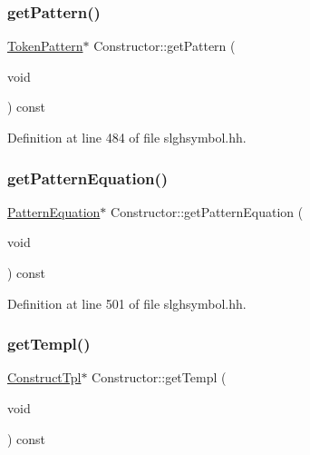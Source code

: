 \subsubsection{\texorpdfstring{getPattern()}{getPattern()}}
{\footnotesize\ttfamily \mbox{\hyperlink{class_token_pattern}{Token\+Pattern}}$\ast$ Constructor\+::get\+Pattern (\begin{DoxyParamCaption}\item[{void}]{ }\end{DoxyParamCaption}) const\hspace{0.3cm}{\ttfamily [inline]}}



Definition at line 484 of file slghsymbol.\+hh.

\mbox{\label{class_constructor_aec435892cdb0a58e40c30f301dc73ced}} 
\subsubsection{\texorpdfstring{getPatternEquation()}{getPatternEquation()}}
{\footnotesize\ttfamily \mbox{\hyperlink{class_pattern_equation}{Pattern\+Equation}}$\ast$ Constructor\+::get\+Pattern\+Equation (\begin{DoxyParamCaption}\item[{void}]{ }\end{DoxyParamCaption}) const\hspace{0.3cm}{\ttfamily [inline]}}



Definition at line 501 of file slghsymbol.\+hh.

\mbox{\label{class_constructor_a7688528dd1486806b75cac5a0c968d75}} 
\subsubsection{\texorpdfstring{getTempl()}{getTempl()}}
{\footnotesize\ttfamily \mbox{\hyperlink{class_construct_tpl}{Construct\+Tpl}}$\ast$ Constructor\+::get\+Templ (\begin{DoxyParamCaption}\item[{void}]{ }\end{DoxyParamCaption}) const\hspace{0.3cm}{\ttfamily [inline]}}



